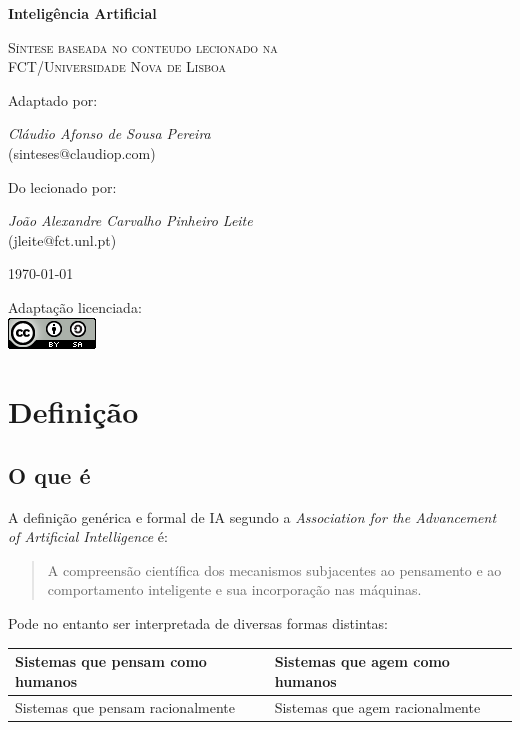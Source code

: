 \documentclass[]{report}
\begin{document}
\begin{titlepage}
	\centering
	\vspace{5cm}
	{\huge\bfseries Inteligência Artificial\par}
	\vspace{1cm}
	{\scshape\Large Síntese baseada no conteudo lecionado na\\
	 FCT/Universidade Nova de Lisboa\par}
	\vspace{2cm}
	Adaptado por:\\
	{\Large \textit{Cláudio Afonso de Sousa Pereira}\\
	(sinteses$\text{@}$claudiop$.$com)\par}
	\vspace{1cm}
	Do lecionado por:\\
	{\Large \textit{João Alexandre Carvalho Pinheiro Leite}\\
	(jleite$\text{@}$fct$.$unl$.$pt)\par}
	\vspace{1cm}
	{\large \today\par}
	\vfill
	Adaptação licenciada:\\
	\href{http://creativecommons.org/licenses/by-sa/4.0/}{\includegraphics[scale=0.8]{ccbysa.png}}
\end{titlepage}
\chapter{Definição}
\section{O que é}
A definição genérica e formal de IA segundo a \textit{Association for the Advancement of Artificial Intelligence} é:
\begin{quote}
A compreensão científica dos mecanismos subjacentes ao pensamento e ao comportamento inteligente e sua incorporação nas máquinas.
\end{quote}
Pode no entanto ser interpretada de diversas formas distintas:
\begin{table}[htbp]
\begin{tabular}{l | l}
Sistemas que pensam como humanos & Sistemas que agem como humanos \\ \hline
Sistemas que pensam racionalmente & Sistemas que agem racionalmente \\
\end{tabular}
\end{table}
\end{document}
